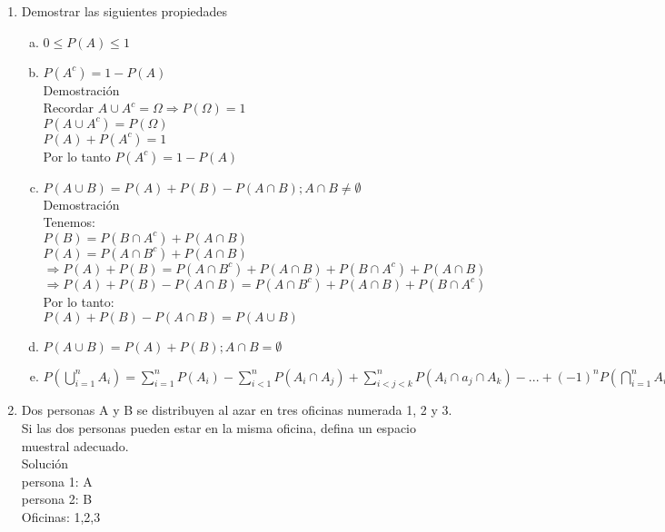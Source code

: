 \documentclass[12pt]{article}
\begin{document}
\begin{enumerate}

\item Demostrar las siguientes propiedades\\
\begin{enumerate}[a)]

\item $0\leqslant P(A) \leqslant 1$

\item $P(A^c) = 1- P(A)$\\
Demostración\\
Recordar $A \cup A^c = \Omega \Rightarrow P(\Omega)=1$\\
$P(A \cup A^c)= P(\Omega)$\\
$P(A)+P(A^c)=1$\\
Por lo tanto $P(A^c)= 1-P(A)$

\item $P(A \cup B)= P(A)+P(B)-P(A \cap B); A\cap B \neq \emptyset$\\
Demostración\\
Tenemos:\\
$P(B)=P(B\cap A^c)+P(A\cap B)$\\
$P(A)=P(A\cap B^c)+P(A\cap B)$\\
$ \Rightarrow {P(A)+P(B)}=P(A\cap B^c)+P(A\cap B)+P(B\cap A^c)+P(A\cap B)$\\
$ \Rightarrow P(A)+P(B)-P(A\cap B)=P(A\cap B^c)+P(A\cap B)+P(B\cap A^c) $\\
Por lo tanto:\\
$P(A)+P(B)-P(A\cap B)=P(A\cup B)$

\item $P(A \cup B)= P(A)+P(B); A\cap B = \emptyset $

\item  $P(\displaystyle\bigcup_{i=1}^{n}{A_i})= \displaystyle\sum_{i=1}^{n}P(A_{i})-\displaystyle\sum_{i<1}^{n} P(A_i\cap A_j)+ \displaystyle\sum_{i<j<k}^{n} P(A_i\cap a_j\cap A_k)-...+(-1)^n P(\displaystyle \bigcap_{i=1}^{n}A_i)$

\end{enumerate}
 

\item Dos personas A y B se distribuyen al azar en tres oficinas numerada 1, 2 y 3. Si las dos personas pueden estar en la misma oficina, defina un espacio muestral adecuado.\\
Solución\\
persona 1: A\\
persona 2: B\\
Oficinas: 1,2,3\\



\end{enumerate}
\end{document}
